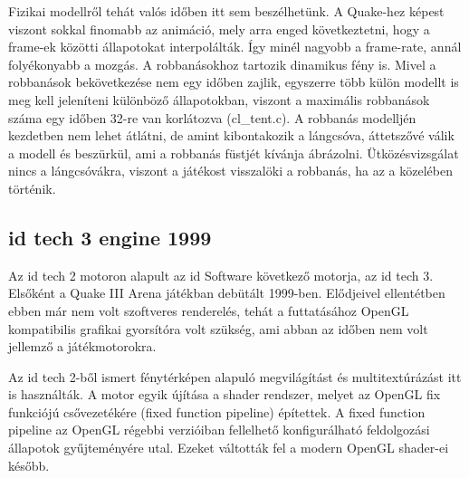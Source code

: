 Fizikai modellről tehát valós időben itt sem beszélhetünk. A Quake-hez képest viszont sokkal finomabb az animáció, mely arra enged következtetni, hogy a frame-ek közötti állapotokat interpolálták. Így minél nagyobb a frame-rate, annál folyékonyabb a mozgás. A robbanásokhoz tartozik dinamikus fény is. Mivel a robbanások bekövetkezése nem egy időben zajlik, egyszerre több külön modellt is meg kell jeleníteni különböző állapotokban, viszont a maximális robbanások száma egy időben 32-re van korlátozva (cl\_tent.c). A robbanás modelljén kezdetben nem lehet átlátni, de amint kibontakozik a lángcsóva, áttetszővé válik a modell és beszürkül, ami a robbanás füstjét kívánja ábrázolni. Ütközésvizsgálat nincs a lángcsóvákra, viszont a játékost visszalöki a robbanás, ha az a közelében történik. 


\subsection{ id tech 3 engine 1999}
Az id tech 2 motoron alapult az id Software következő motorja, az id tech 3. Elsőként a Quake III Arena játékban debütált 1999-ben. Elődjeivel ellentétben ebben már nem volt szoftveres renderelés, tehát a futtatásához OpenGL kompatibilis grafikai gyorsítóra volt szükség, ami abban az időben nem volt jellemző a játékmotorokra. \cite{wikiQuake3}

Az id tech 2-ből ismert fénytérképen alapuló megvilágítást és multitextúrázást itt is használták. A motor egyik újítása a shader rendszer, melyet az OpenGL fix funkciójú csővezetékére (fixed function pipeline) építettek. A fixed function pipeline az OpenGL régebbi verzióiban fellelhető konfigurálható feldolgozási állapotok gyűjteményére utal. Ezeket váltották fel a modern OpenGL shader-ei később. \cite{fsQuake3}  

